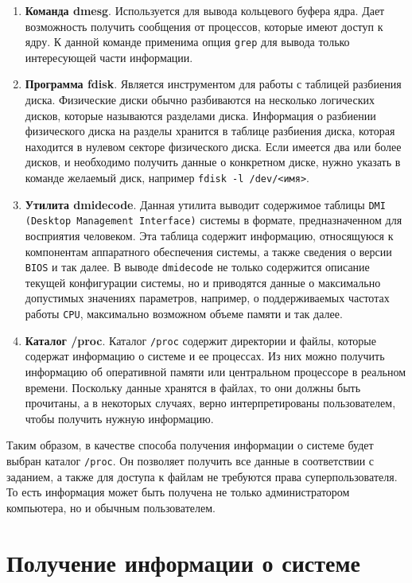\begin{enumerate}
    \item \textbf{Команда dmesg}. Используется для вывода кольцевого буфера ядра. Дает возможность получить сообщения от процессов, которые имеют доступ к ядру. К данной команде применима опция \texttt{grep} для вывода только интересующей части информации.
    \item \textbf{Программа fdisk}. Является инструментом для работы с таблицей разбиения диска. Физические диски обычно разбиваются на несколько логических дисков, которые называются разделами диска. Информация о разбиении физического диска на разделы хранится в таблице разбиения диска, которая находится в нулевом секторе физического диска. Если имеется два или более дисков, и необходимо получить данные о конкретном диске, нужно указать в команде желаемый диск, например \texttt{fdisk -l /dev/<имя>}.
    \item \textbf{Утилита dmidecode}. Данная утилита выводит содержимое таблицы \texttt{DMI (Desktop Management Interface)} системы в формате, предназначенном для восприятия человеком. Эта таблица содержит информацию, относящуюся к компонентам аппаратного обеспечения системы, а также сведения о версии \texttt{BIOS} и так далее. В выводе \texttt{dmidecode} не только содержится описание текущей конфигурации системы, но и приводятся данные о максимально допустимых значениях параметров, например, о поддерживаемых частотах работы \texttt{CPU}, максимально возможном объеме памяти и так далее.
    \item \textbf{Каталог /proc}. Каталог \texttt{/proc} содержит директории и файлы, которые содержат информацию о системе и ее процессах. Из них можно получить информацию об оперативной памяти или центральном процессоре в реальном времени. Поскольку данные хранятся в файлах, то они должны быть прочитаны, а в некоторых случаях, верно интерпретированы пользователем, чтобы получить нужную информацию.
\end{enumerate}

Таким образом, в качестве способа получения информации о системе будет выбран каталог \texttt{/proc}. Он позволяет получить все данные в соответствии с заданием, а также для доступа к файлам не требуются права суперпользователя. То есть информация может быть получена не только администратором компьютера, но и обычным пользователем.


\section{Получение информации о системе}

